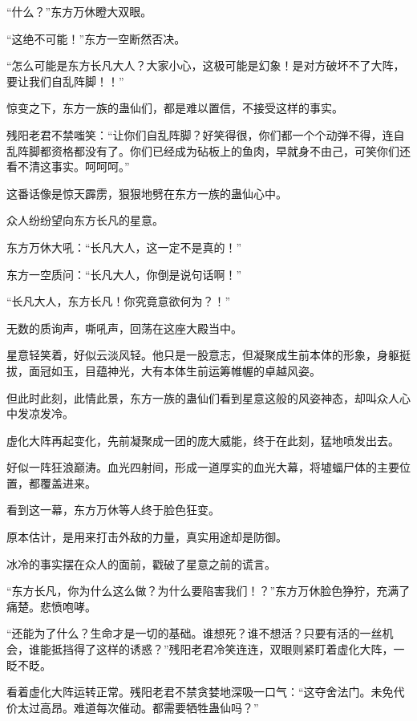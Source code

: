
\begin{this_body}



“什么？”东方万休瞪大双眼。

“这绝不可能！”东方一空断然否决。

“怎么可能是东方长凡大人？大家小心，这极可能是幻象！是对方破坏不了大阵，要让我们自乱阵脚！！”

惊变之下，东方一族的蛊仙们，都是难以置信，不接受这样的事实。

残阳老君不禁嗤笑：“让你们自乱阵脚？好笑得很，你们都一个个动弹不得，连自乱阵脚都资格都没有了。你们已经成为砧板上的鱼肉，早就身不由己，可笑你们还看不清这事实。呵呵呵。”

这番话像是惊天霹雳，狠狠地劈在东方一族的蛊仙心中。

众人纷纷望向东方长凡的星意。

东方万休大吼：“长凡大人，这一定不是真的！”

东方一空质问：“长凡大人，你倒是说句话啊！”

“长凡大人，东方长凡！你究竟意欲何为？！”

无数的质询声，嘶吼声，回荡在这座大殿当中。

星意轻笑着，好似云淡风轻。他只是一股意志，但凝聚成生前本体的形象，身躯挺拔，面冠如玉，目蕴神光，大有本体生前运筹帷幄的卓越风姿。

但此时此刻，此情此景，东方一族的蛊仙们看到星意这般的风姿神态，却叫众人心中发凉发冷。

虚化大阵再起变化，先前凝聚成一团的庞大威能，终于在此刻，猛地喷发出去。

好似一阵狂浪巅涛。血光四射间，形成一道厚实的血光大幕，将墟蝠尸体的主要位置，都覆盖进来。

看到这一幕，东方万休等人终于脸色狂变。

原本估计，是用来打击外敌的力量，真实用途却是防御。

冰冷的事实摆在众人的面前，戳破了星意之前的谎言。

“东方长凡，你为什么这么做？为什么要陷害我们！？”东方万休脸色狰狞，充满了痛楚。悲愤咆哮。

“还能为了什么？生命才是一切的基础。谁想死？谁不想活？只要有活的一丝机会，谁能抵挡得了这样的诱惑？”残阳老君冷笑连连，双眼则紧盯着虚化大阵，一眨不眨。

看着虚化大阵运转正常。残阳老君不禁贪婪地深吸一口气：“这夺舍法门。未免代价太过高昂。难道每次催动。都需要牺牲蛊仙吗？”


\end{this_body}
